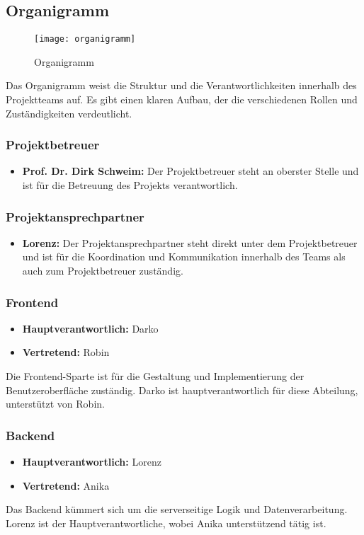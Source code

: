 \subsection{Organigramm}\label{subsec:Organigramm}

\begin{figure}[H]
    \centering
    \texttt{[image: organigramm]}
    \caption{Organigramm}
\end{figure}

Das Organigramm weist die Struktur und die Verantwortlichkeiten innerhalb des Projektteams auf. Es gibt einen klaren Aufbau, der die verschiedenen Rollen und Zuständigkeiten verdeutlicht.

\subsubsection{Projektbetreuer}
\begin{itemize}
    \item \textbf{Prof. Dr. Dirk Schweim:} Der Projektbetreuer steht an oberster Stelle und ist für die Betreuung des Projekts verantwortlich.
\end{itemize}

\subsubsection{Projektansprechpartner}
\begin{itemize}
    \item \textbf{Lorenz:} Der Projektansprechpartner steht direkt unter dem Projektbetreuer und ist für die Koordination und Kommunikation innerhalb des Teams als auch zum Projektbetreuer zuständig.
\end{itemize}


\subsubsection{Frontend}
\begin{itemize}
    \item \textbf{Hauptverantwortlich:} Darko
    \item \textbf{Vertretend:} Robin
\end{itemize}
Die Frontend-Sparte ist für die Gestaltung und Implementierung der Benutzeroberfläche zuständig.
Darko ist hauptverantwortlich für diese Abteilung, unterstützt von Robin.

\subsubsection{Backend}
\begin{itemize}
    \item \textbf{Hauptverantwortlich:} Lorenz
    \item \textbf{Vertretend:} Anika
\end{itemize}
Das Backend kümmert sich um die serverseitige Logik und Datenverarbeitung.
Lorenz ist der Hauptverantwortliche, wobei Anika unterstützend tätig ist.

